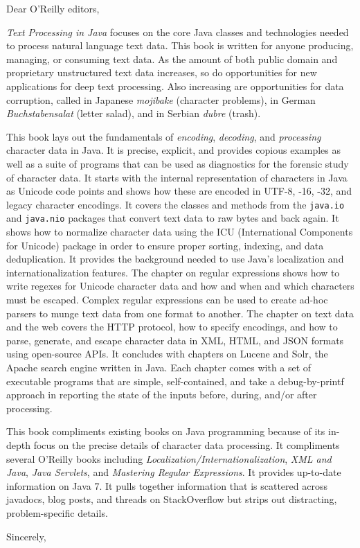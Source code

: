 \documentclass{letter}
\begin{document}
\begin{letter}{}
\opening{Dear O'Reilly editors,}

\emph{Text Processing in Java} focuses on the core Java classes and
technologies needed to process natural language text data.
This book is written for anyone producing, managing, or consuming text data.
As the amount of both public domain and proprietary unstructured text data
increases, so do opportunities for new applications for deep text processing.
Also increasing are opportunities for data corruption, called in Japanese \emph{mojibake}
(character problems),
in German \emph{Buchstabensalat} (letter salad),
and in Serbian \emph{dubre} (trash).

This book lays out the fundamentals of \emph{encoding}, \emph{decoding},
and \emph{processing} character data in Java.
It is precise, explicit, and provides copious examples
as well as a suite of programs that can be used 
as diagnostics for the forensic study of character data.
It starts with the internal representation of characters in Java as Unicode code points
and shows how these are encoded in UTF-8, -16, -32, and legacy character encodings.
It covers the classes and methods from the \texttt{java.io} and \texttt{java.nio} packages
that convert text data to raw bytes and back again.
It shows how to normalize character data using the ICU 
(International Components for Unicode) package
in order to ensure proper sorting, indexing, and data deduplication.
It provides the background needed to use Java's
localization and internationalization features.
The chapter on regular expressions shows how to
write regexes for Unicode character data and how
and when and which characters must be escaped.
Complex regular expressions can be used to create
ad-hoc parsers to munge text data from one format to another.
The chapter on text data and the web covers the HTTP protocol,
how to specify encodings, and how to parse, generate, and escape
character data in XML, HTML, and JSON formats using open-source APIs.
It concludes with chapters on Lucene and Solr,
the Apache search engine written in Java.
Each chapter comes with a set of executable programs
that are simple, self-contained, and take a
debug-by-printf approach in reporting the state of the inputs
before, during, and/or after processing.

This book compliments existing books on Java programming because
of its in-depth focus on the precise details of character data processing.
It compliments several O'Reilly books including
\emph{Localization/Internationalization}, 
\emph{XML and Java},
\emph{Java Servlets},
and \emph{Mastering Regular Expressions}.
It provides up-to-date information on Java 7.
It pulls together information that is scattered across javadocs, blog posts, and threads on 
StackOverflow but strips out distracting, problem-specific details. 

\closing{Sincerely,}
\end{letter}
\end{document}
